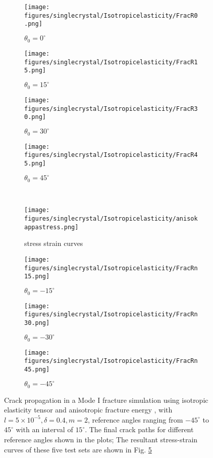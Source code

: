 \documentclass[3p,10pt,sort&compress]{elsarticle}
\begin{document}
\begin{figure*}[!htb]
	\centering
  \begin{subfigure}{0.23\textwidth}
		\texttt{[image: figures/singlecrystal/Isotropicelasticity/FracR0.png]}
		\caption{$\theta_0 = 0^{\circ}$}
	  \label{fig:theta0_0}
	\end{subfigure}
	\begin{subfigure}{0.23\textwidth}
		\texttt{[image: figures/singlecrystal/Isotropicelasticity/FracR15.png]}
		\caption{$\theta_0 = 15^{\circ}$}
	  \label{fig:theta0_15}
	\end{subfigure}
	\begin{subfigure}{0.23\textwidth}
		\texttt{[image: figures/singlecrystal/Isotropicelasticity/FracR30.png]}
		\caption{$\theta_0 = 30^{\circ}$}
	  \label{fig:theta0_30}
	\end{subfigure}
  \begin{subfigure}{0.23\textwidth}
		\texttt{[image: figures/singlecrystal/Isotropicelasticity/FracR45.png]}
		\caption{$\theta_0 = 45^{\circ}$}
	  \label{fig:theta0_45}
	\end{subfigure}
  \\
  \begin{subfigure}{0.23\textwidth}
    \texttt{[image: figures/singlecrystal/Isotropicelasticity/anisokappastress.png]}
    \caption{stress strain curves}
    \label{fig:stressstraincurveforanisokappa}
  \end{subfigure}
  \begin{subfigure}{0.23\textwidth}
    \texttt{[image: figures/singlecrystal/Isotropicelasticity/FracRn15.png]}
    \caption{$\theta_0 = -15^{\circ}$}
    \label{fig:theta0_n15}
  \end{subfigure}
  \begin{subfigure}{0.23\textwidth}
    \texttt{[image: figures/singlecrystal/Isotropicelasticity/FracRn30.png]}
    \caption{$\theta_0 = -30^{\circ}$}
    \label{fig:theta0_n30}
  \end{subfigure}
  \begin{subfigure}{0.23\textwidth}
    \texttt{[image: figures/singlecrystal/Isotropicelasticity/FracRn45.png]}
    \caption{$\theta_0 = -45^{\circ}$}
    \label{fig:theta0_n45}
  \end{subfigure}
	\caption{Crack propagation in a Mode I fracture simulation using isotropic elasticity tensor and anisotropic fracture energy , with $l=5\times10^{-5}, \delta = 0.4, m=2$, reference angles ranging from $-45^{\circ}$ to $45^{\circ}$ with an interval of $15^{\circ}$. The final crack paths for different reference angles shown in the plots;
  The resultant stress-strain curves of these five test sets are shown in Fig. \ref{fig:stressstraincurveforanisokappa}}
  \label{fig:anisokappa_mode_I}
\end{figure*}
\end{document}
